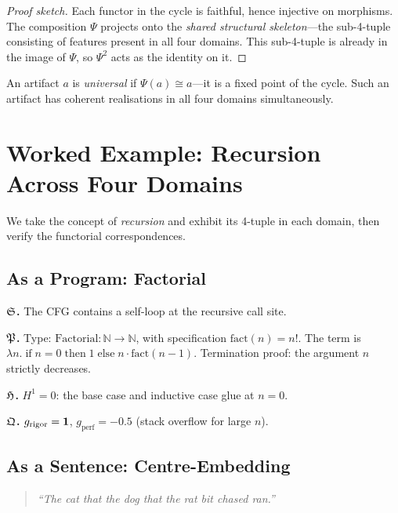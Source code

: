 \begin{proof}[Proof sketch]
Each functor in the cycle is faithful, hence injective on
morphisms.  The composition $\Psi$ projects onto the
\emph{shared structural skeleton}---the sub-4-tuple consisting
of features present in all four domains.  This sub-4-tuple is
already in the image of $\Psi$, so $\Psi^2$ acts as the
identity on it.
\end{proof}

\begin{definition}
An artifact $a$ is \emph{universal} if $\Psi(a)\cong a$---it
is a fixed point of the cycle.  Such an artifact has coherent
realisations in all four domains simultaneously.
\end{definition}

\section{Worked Example: Recursion Across Four Domains}
\label{sec:recursion}

We take the concept of \emph{recursion} and exhibit its
4-tuple in each domain, then verify the functorial
correspondences.

\subsection{As a Program: Factorial}

\textbf{$\mathfrak{S}$.}\quad
The CFG contains a self-loop at the recursive call site.

\textbf{$\mathfrak{P}$.}\quad
Type: $\mathrm{Factorial}:\mathbb{N}\to\mathbb{N}$,
with specification $\mathrm{fact}(n)=n!$.  The term
is $\lambda n.\;\mathrm{if}\;n=0\;\mathrm{then}\;1\;
\mathrm{else}\;n\cdot\mathrm{fact}(n-1)$.
Termination proof: the argument $n$ strictly decreases.

\textbf{$\mathfrak{H}$.}\quad
$H^1=0$: the base case and inductive case glue at $n=0$.

\textbf{$\mathfrak{Q}$.}\quad
$g_{\mathrm{rigor}}=\mathbf{1}$, $g_{\mathrm{perf}}=-0.5$
(stack overflow for large $n$).

\subsection{As a Sentence: Centre-Embedding}

\begin{quote}
\emph{``The cat that the dog that the rat bit chased ran.''}
\end{quote}

